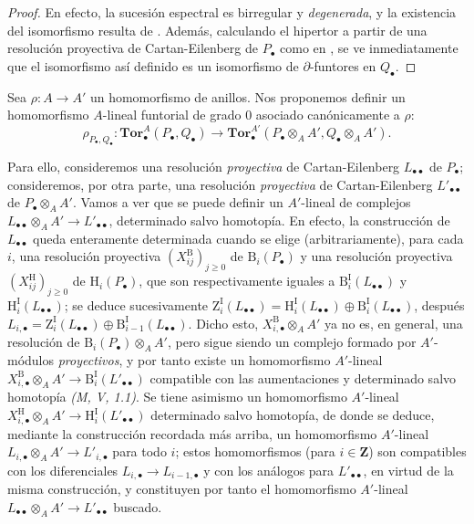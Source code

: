 \begin{proof}
En efecto, la sucesión espectral  es birregular y
\emph{degenerada}, y la existencia del isomorfismo  resulta de
. Además,
calculando el hipertor a partir de una resolución proyectiva de
Cartan-Eilenberg de $P_\bullet$ como en , se ve
inmediatamente que el
isomorfismo así definido es un isomorfismo de $\partial$-funtores en
$Q_\bullet$.
\end{proof}
\begin{env}[6.3.8]
\label{III.6.3.8}
Sea $\rho:A\to A'$ un homomorfismo de anillos. Nos proponemos definir un
homomorfismo $A$-lineal funtorial de grado 0 asociado canónicamente a $\rho$:
\[
  \rho_{P_\bullet,Q_\bullet}:
  \mathbf{Tor}_\bullet^A(P_\bullet,Q_\bullet)
  \longrightarrow
  \mathbf{Tor}_\bullet^{A'}
  (P_\bullet\otimes_A A',Q_\bullet\otimes_A A').
  \tag{6.3.8.1}\label{III.6.3.8.1.fr}
\]

Para ello, consideremos una resolución \emph{proyectiva} de Cartan-Eilenberg
$L_{\bullet\bullet}$ de $P_\bullet$; consideremos, por otra parte, una
resolución \emph{proyectiva} de Cartan-Eilenberg $L'_{\bullet\bullet}$ de
$P_\bullet\otimes_A A'$. Vamos a ver que se puede definir un $A'$-lineal de complejos
$L_{\bullet\bullet}\otimes_A A'\to L'_{\bullet\bullet}$, determinado salvo
homotopía. En efecto, la construcción de $L_{\bullet\bullet}$ queda
enteramente determinada cuando se elige (arbitrariamente), para cada $i$,
una resolución proyectiva $(X_{ij}^{\mathrm B})_{j\geqslant0}$ de
$\mathrm B_i(P_\bullet)$ y una resolución proyectiva
$(X_{ij}^{\mathrm H})_{j\geqslant0}$ de $\mathrm H_i(P_\bullet)$, que son
respectivamente iguales a $\mathrm B_i^{\mathrm I}(L_{\bullet\bullet})$ y
$\mathrm H_i^{\mathrm I}(L_{\bullet\bullet})$; se deduce sucesivamente
$\mathrm Z_i^{\mathrm I}(L_{\bullet\bullet})
=\mathrm H_i^{\mathrm I}(L_{\bullet\bullet})
\oplus\mathrm B_i^{\mathrm I}(L_{\bullet\bullet})$, después
$L_{i,\bullet}=\mathrm Z_i^{\mathrm I}(L_{\bullet\bullet})
\oplus\mathrm B_{i-1}^{\mathrm I}(L_{\bullet\bullet})$. Dicho esto, $X_{i,\bullet}^{\mathrm B}\otimes_A A'$ ya no es, en general,
una resolución de $\mathrm B_i(P_\bullet)\otimes_A A'$, pero sigue siendo un
complejo formado por $A'$-módulos \emph{proyectivos}, y por tanto existe un
homomorfismo $A'$-lineal
$X_{i,\bullet}^{\mathrm B}\otimes_A A'
\to\mathrm B_i^{\mathrm I}(L'_{\bullet\bullet})$
compatible con las aumentaciones y determinado salvo homotopía
\emph{(M, V, 1.1)}. Se tiene asimismo un homomorfismo $A'$-lineal
$X_{i,\bullet}^{\mathrm H}\otimes_A A'
\to\mathrm H_i^{\mathrm I}(L'_{\bullet\bullet})$
determinado salvo homotopía, de donde se deduce, mediante la construcción
recordada más arriba, un homomorfismo $A'$-lineal
$L_{i,\bullet}\otimes_A A'\to L'_{i,\bullet}$ para todo $i$; estos
homomorfismos (para $i\in\mathbf Z$) son compatibles con los diferenciales
$L_{i,\bullet}\to L_{i-1,\bullet}$ y con los análogos para
$L'_{\bullet\bullet}$, en virtud de la misma construcción, y constituyen por
tanto el homomorfismo $A'$-lineal
$L_{\bullet\bullet}\otimes_A A'\to L'_{\bullet\bullet}$ buscado.


\end{env}
